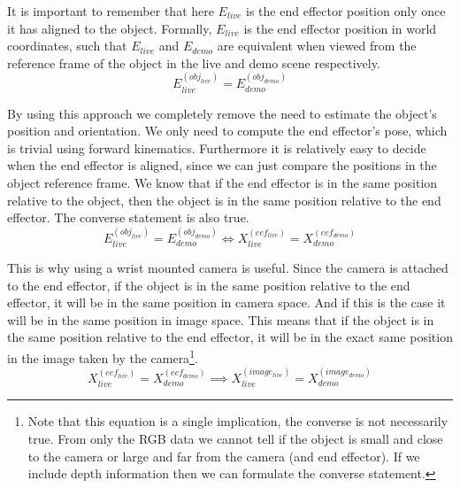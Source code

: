 It is important to remember that here $E_{live}$ is the end effector position only once it has aligned to the object. Formally, $E_{live}$ is the end effector position in world coordinates, such that $E_{live}$ and $E_{demo}$ are equivalent when viewed from the reference frame of the object in the live and demo scene respectively.
$$E_{live}^{(obj_{live})} = E_{demo}^{(obj_{demo})}$$

By using this approach we completely remove the need to estimate the object's position and orientation. We only need to compute the end effector's pose, which is trivial using forward kinematics. Furthermore it is relatively easy to decide when the end effector is aligned, since we can just compare the positions in the object reference frame. We know that if the end effector is in the same position relative to the object, then the object is in the same position relative to the end effector. The converse statement is also true.
$$E_{live}^{(obj_{live})} = E_{demo}^{(obj_{demo})} \iff X_{live}^{(eef_{live})} = X_{demo}^{(eef_{demo})}$$

This is why using a wrist mounted camera is useful. Since the camera is attached to the end effector, if the object is in the same position relative to the end effector, it will be in the same position in camera space. And if this is the case it will be in the same position in image space. This means that if the object is in the same position relative to the end effector, it will be in the exact same position in the image taken by the camera\footnote{Note that this equation is a single implication, the converse is not necessarily true. From only the RGB data we cannot tell if the object is small and close to the camera or large and far from the camera (and end effector). If we include depth information then we can formulate the converse statement.}.
$$X_{live}^{(eef_{live})} = X_{demo}^{(eef_{demo})} \implies X_{live}^{(image_{live})} = X_{demo}^{(image_{demo})}$$

